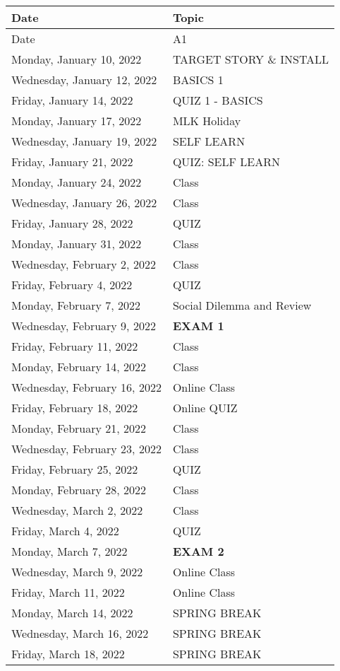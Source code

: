 \documentclass[
]{book}
\begin{document}
\begin{longtable}[]{@{}ll@{}}
\toprule
Date & Topic \\
\midrule
\endhead
Date & A1 \\
Monday, January 10, 2022 & TARGET STORY \& INSTALL \\
Wednesday, January 12, 2022 & BASICS 1 \\
Friday, January 14, 2022 & QUIZ 1 - BASICS \\
Monday, January 17, 2022 & MLK Holiday \\
Wednesday, January 19, 2022 & SELF LEARN \\
Friday, January 21, 2022 & QUIZ: SELF LEARN \\
Monday, January 24, 2022 & Class \\
Wednesday, January 26, 2022 & Class \\
Friday, January 28, 2022 & QUIZ \\
Monday, January 31, 2022 & Class \\
Wednesday, February 2, 2022 & Class \\
Friday, February 4, 2022 & QUIZ \\
Monday, February 7, 2022 & Social Dilemma and Review \\
Wednesday, February 9, 2022 & \textbf{EXAM 1} \\
Friday, February 11, 2022 & Class \\
Monday, February 14, 2022 & Class \\
Wednesday, February 16, 2022 & Online Class \\
Friday, February 18, 2022 & Online QUIZ \\
Monday, February 21, 2022 & Class \\
Wednesday, February 23, 2022 & Class \\
Friday, February 25, 2022 & QUIZ \\
Monday, February 28, 2022 & Class \\
Wednesday, March 2, 2022 & Class \\
Friday, March 4, 2022 & QUIZ \\
Monday, March 7, 2022 & \textbf{EXAM 2} \\
Wednesday, March 9, 2022 & Online Class \\
Friday, March 11, 2022 & Online Class \\
Monday, March 14, 2022 & SPRING BREAK \\
Wednesday, March 16, 2022 & SPRING BREAK \\
Friday, March 18, 2022 & SPRING BREAK \\

\end{longtable}
\end{document}
